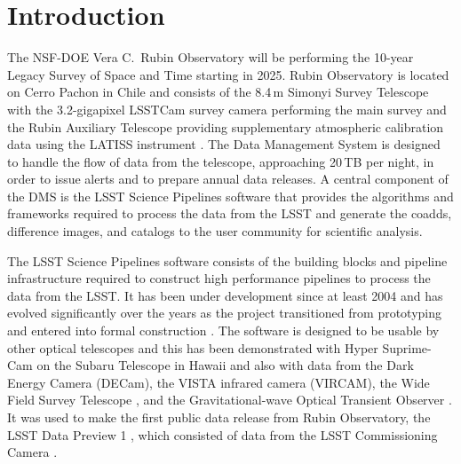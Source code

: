 \section{Introduction}
\label{sec:intro}

The NSF-DOE Vera C.\ Rubin Observatory will be performing the 10-year Legacy Survey of Space and Time \citep[LSST;][]{2019ApJ...873..111I} starting in 2025.
Rubin Observatory is located on Cerro Pachon in Chile and consists of the 8.4\,m Simonyi Survey Telescope \citep{2022SPIE12182E..0WT} with the 3.2-gigapixel LSSTCam survey camera \citep{10.71929/rubin/2571927,2024SPIE13096E..1SR} performing the main survey and the Rubin Auxiliary Telescope \citep{2020SPIE11452E..0UI} providing supplementary atmospheric calibration data using the LATISS instrument \citep{10.71929/rubin/2571930}.
The Data Management System \citep[DMS;][]{2022arXiv221113611O} is designed to handle the flow of data from the telescope, approaching 20\,TB per night, in order to issue alerts and to prepare annual data releases.
A central component of the DMS is the LSST Science Pipelines software that provides the algorithms and frameworks required to process the data from the LSST and generate the coadds, difference images, and catalogs to the user community for scientific analysis.

The LSST Science Pipelines software consists of the building blocks and pipeline infrastructure required to construct high performance pipelines to process the data from the LSST.
It has been under development since at least 2004 \citep{2004AAS...20510811A} and has evolved significantly over the years as the project transitioned from prototyping \citep{2010SPIE.7740E..15A} and entered into formal construction \citep{2017ASPC..512..279J}.
The software is designed to be usable by other optical telescopes and this has been demonstrated with Hyper Suprime-Cam on the Subaru Telescope in Hawaii \citep{2018PASJ...70S...5B} and also with data from the Dark Energy Camera (DECam),  the VISTA infrared camera (VIRCAM), the Wide Field Survey Telescope \citep[WFST;][]{2025arXiv250115018C}, and the Gravitational-wave Optical Transient Observer \citep[GOTO;][]{2021PASA...38....4M}.
It was used to make the first public data release from Rubin Observatory, the LSST Data Preview 1 \citep{RTN-095,10.71929/rubin/2570308}, which consisted of data from the LSST Commissioning Camera \citep[LSSTComCam;][]{10.71929/rubin/2561361,2022SPIE12184E..0JS}.

